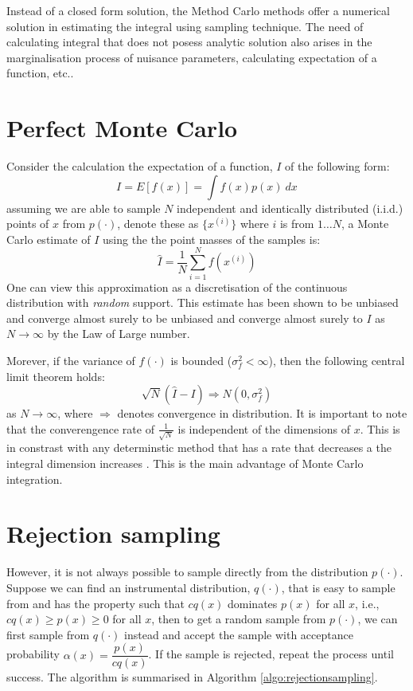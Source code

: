 Instead of a closed form solution, the Method Carlo methods offer a numerical solution in estimating the integral using sampling technique. The need of calculating integral that does not posess analytic solution also arises in the marginalisation process of nuisance parameters, calculating expectation of a function, etc..

\section{Perfect Monte Carlo}
Consider the calculation the expectation of a function, $I$ of the following form:
\begin{equation}
  I = E[f(x)] = \int f(x)p(x)~dx
\label{eq:expectation}
\end{equation}
assuming we are able to sample $N$ independent and identically distributed (i.i.d.) points of $x$ from $p(\cdot)$, denote these as $\{x^{(i)}\}$ where $i$ is from $1 \ldots N$, a Monte Carlo estimate of $I$ using the the point masses of the samples is:
\begin{equation}
  \hat{I} = \frac{1}{N} \sum^N_{i=1} f(x^{(i)})
\end{equation}
One can view this approximation as a discretisation of the continuous distribution with \emph{random} support. This estimate has been shown to be unbiased and converge almost surely to be unbiased and converge almost surely to $I$ as $N \rightarrow \infty$ by the Law of Large number.

Morever, if the variance of $f(\cdot)$ is bounded ($\sigma^2_f < \infty$), then the following central limit theorem holds:
\begin{equation}
  \sqrt{N}(\hat{I} - I) \Longrightarrow N(0, \sigma^2_f)
\end{equation}
as $N \rightarrow \infty$, where $\Longrightarrow$ denotes convergence in distribution. It is important to note that the converengence rate of $\frac{1}{\sqrt{N}}$ is independent of the dimensions of $x$. This is in constrast with any determinstic method that has a rate that decreases a the integral dimension increases \cite{RCP05}. This is the main advantage of Monte Carlo integration.

\section{Rejection sampling}
However, it is not always possible to sample directly from the distribution $p(\cdot)$. Suppose we can find an instrumental distribution, $q(\cdot)$, that is easy to sample from and has the property such that $cq(x)$ dominates $p(x)$ for all $x$, i.e., $cq(x) \geq p(x) \geq 0$ for all $x$, then to get a random sample from $p(\cdot)$, we can first sample from $q(\cdot)$ instead and accept the sample with acceptance probability $\alpha(x)=\dfrac{p(x)}{cq(x)}$. If the sample is rejected, repeat the process until success. The algorithm is summarised in Algorithm \ref{algo:rejectionsampling}.

